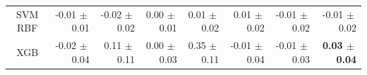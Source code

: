\begin{table}[htb]
\begin{tabular}{crrrrrrr}
\gls{SVM} RBF      & -0.01 $\pm~$0.01                                       & -0.02 $\pm~$0.02              & 0.00 $\pm~$0.01                                       & 0.01 $\pm~$0.02             & 0.01 $\pm~$0.02                                         & -0.01 $\pm~$0.02                                           & -0.01 $\pm~$0.02                                              \\
XGB     & -0.02 $\pm~$0.04                                       & 0.11 $\pm~$0.11               & 0.00 $\pm~$0.03                                       & 0.35 $\pm~$0.11             & -0.01 $\pm~$0.04                                         & -0.01 $\pm~$0.03                                           & \textbf{0.03 $\pm~$0.04}                                               \\ \hline
\end{tabular}

\end{table}
